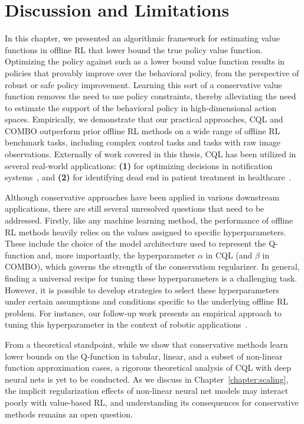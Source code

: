 \documentclass[../thesis.tex]{subfiles}
\begin{document}
\vspace{-0.2cm}
\section{Discussion and Limitations}
\vspace{-0.2cm}
In this chapter, we presented an algorithmic framework for estimating value functions in offline RL that lower bound the true policy value function. Optimizing the policy against such as a lower bound value function results in policies that provably improve over the behavioral policy, from the perspective of robust or safe policy improvement. Learning this sort of a conservative value function removes the need to use policy constraints, thereby alleviating the need to estimate the support of the behavioral policy in high-dimensional action spaces. Empirically, we demonstrate that our practical approaches, CQL and COMBO outperform prior offline RL methods on a wide range of offline RL benchmark tasks, including complex control tasks and tasks with raw image observations. Externally of work covered in this thesis, CQL has been utilized in several real-world applications: \textbf{(1)} for optimizing decisions in notification systems~\citep{prabhakar2022multi}, and \textbf{(2)} for identifying dead end in patient treatment in healthcare~\citep{killian2023risk}.  

Although conservative approaches have been applied in various downstream applications, there are still several unresolved questions that need to be addressed. Firstly, like any machine learning method, the performance of offline RL methods heavily relies on the values assigned to specific hyperparameters. These include the choice of the model architecture used to represent the Q-function and, more importantly, the hyperparameter $\alpha$ in CQL (and $\beta$ in COMBO), which governs the strength of the conservatism regularizer. In general, finding a universal recipe for tuning these hyperparameters is a challenging task. However, it is possible to develop strategies to select these hyperparameters under certain assumptions and conditions specific to the underlying offline RL problem. For instance, our follow-up work presents an empirical approach to tuning this hyperparameter in the context of robotic applications~\citep{kumar2021workflow}.

From a theoretical standpoint, while we show that conservative methods learn lower bounds on the Q-function in tabular, linear, and a subset of non-linear function approximation cases, a rigorous theoretical analysis of CQL with deep neural nets is yet to be conducted. As we discuss in Chapter~\ref{chapter:scaling}, the implicit regularization effects of non-linear neural net models may interact poorly with value-based RL, and understanding its consequences for conservative methods remains an open question.
\end{document}
